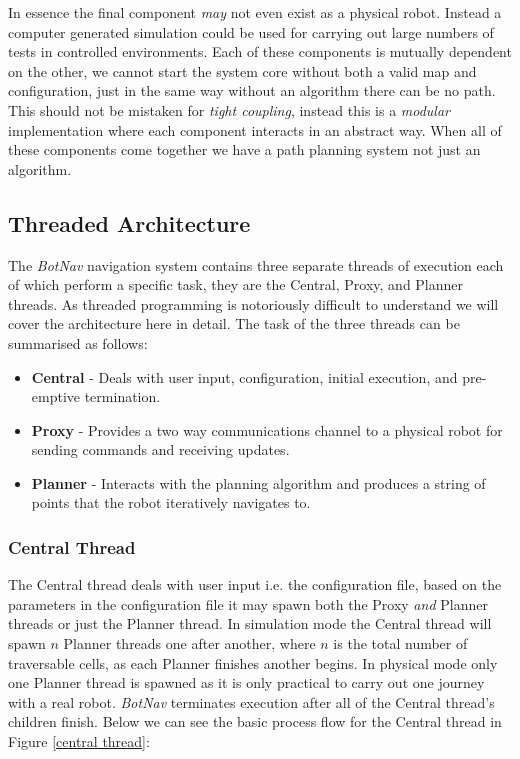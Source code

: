 \noindent
In essence the final component \textit{may} not even exist as a physical robot. Instead a computer generated simulation could be used for carrying out large numbers of tests in controlled environments. Each of these components is mutually dependent on the other, we cannot start the system core without both a valid map and configuration, just in the same way without an algorithm there can be no path. This should not be mistaken for \textit{tight coupling}, instead this is a \textit{modular} implementation where each component interacts in an abstract way. When all of these components come together we have a path planning system not just an algorithm.

\subsection{Threaded Architecture}

\noindent
The \textit{BotNav} navigation system contains three separate threads of execution each of which perform a specific task, they are the Central, Proxy, and Planner threads. As threaded programming is notoriously difficult to understand we will cover the architecture here in detail. The task of the three threads can be summarised as follows: 

\begin{itemize}
\item \textbf{Central} - Deals with user input, configuration, initial execution, and pre-emptive termination. 
\item \textbf{Proxy} - Provides a two way communications channel to a physical robot for sending commands and receiving updates.
\item \textbf{Planner} - Interacts with the planning algorithm and produces a string of points that the robot iteratively navigates to.
\end{itemize} 

\subsubsection*{Central Thread}
\noindent
The Central thread deals with user input i.e. the configuration file, based on the parameters in the configuration file it may spawn both the Proxy \textit{and} Planner threads or just the Planner thread. In simulation mode the Central thread will spawn $n$ Planner threads one after another, where $n$ is the total number of traversable cells, as each Planner finishes another begins. In physical mode only one Planner thread is spawned as it is only practical to carry out one journey with a real robot. \textit{BotNav} terminates execution after all of the Central thread's children finish. Below we can see the basic process flow for the Central thread in Figure \ref{central thread}:

